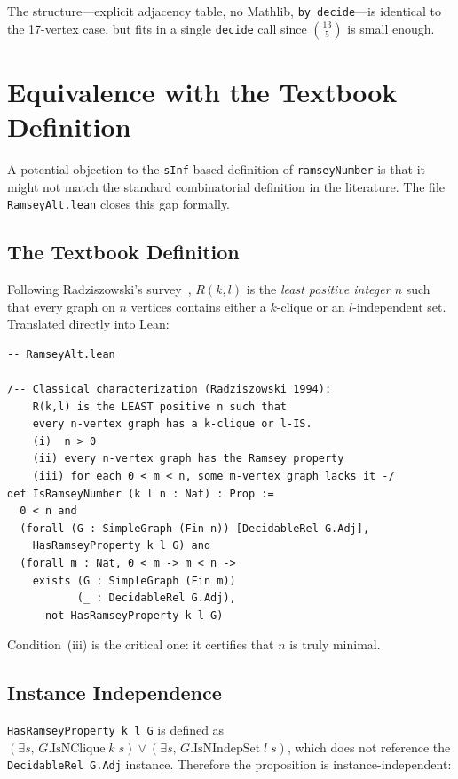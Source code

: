 \documentclass[11pt]{article}
\newcommand{\lean}[1]{\texttt{#1}}
\begin{document}
\noindent
The structure---explicit adjacency table, no Mathlib, \lean{by decide}---is
identical to the 17-vertex case, but fits in a single \lean{decide} call
since $\binom{13}{5}$ is small enough.

\section{Equivalence with the Textbook Definition}
\label{sec:textbook}

A potential objection to the \lean{sInf}-based definition of \lean{ramseyNumber} is
that it might not match the standard combinatorial definition in the literature.
The file \texttt{RamseyAlt.lean} closes this gap formally.

\subsection{The Textbook Definition}

Following Radziszowski's survey~\cite{radziszowski}, $R(k,l)$ is the
\emph{least positive integer $n$} such that every graph on $n$ vertices
contains either a $k$-clique or an $l$-independent set.
Translated directly into Lean:

\begin{lstlisting}
-- RamseyAlt.lean

/-- Classical characterization (Radziszowski 1994):
    R(k,l) is the LEAST positive n such that
    every n-vertex graph has a k-clique or l-IS.
    (i)  n > 0
    (ii) every n-vertex graph has the Ramsey property
    (iii) for each 0 < m < n, some m-vertex graph lacks it -/
def IsRamseyNumber (k l n : Nat) : Prop :=
  0 < n and
  (forall (G : SimpleGraph (Fin n)) [DecidableRel G.Adj],
    HasRamseyProperty k l G) and
  (forall m : Nat, 0 < m -> m < n ->
    exists (G : SimpleGraph (Fin m))
           (_ : DecidableRel G.Adj),
      not HasRamseyProperty k l G)
\end{lstlisting}

\noindent
Condition~(iii) is the critical one: it certifies that $n$ is truly minimal.

\subsection{Instance Independence}

\lean{HasRamseyProperty k l G} is defined as
$(\exists s,\, G.\text{IsNClique}\; k\; s) \lor (\exists s,\, G.\text{IsNIndepSet}\; l\; s)$,
which does not reference the \lean{DecidableRel G.Adj} instance.
Therefore the proposition is instance-independent:
\end{document}

